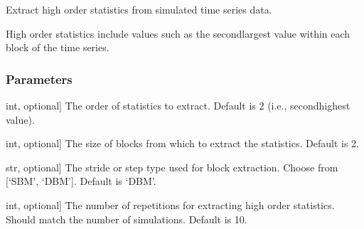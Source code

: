 \documentclass[a4paper,11pt,openany,english]{sphinxmanual}
\begin{document}
\begin{fulllineitems}
\begin{fulllineitems}
\end{fulllineitems}


\begin{fulllineitems}
\label{\detokenize{api_topt:xtremes.topt.TimeSeries.get_HOS}}
\pysigstartsignatures
{}
\pysigstopsignatures
\sphinxAtStartPar
Extract high order statistics from simulated time series data.

\sphinxAtStartPar
High order statistics include values such as the second\sphinxhyphen{}largest value within each block of the time series.


\subsubsection{Parameters}
\label{\detokenize{api_topt:id1}}\begin{description}
\sphinxlineitem{orderstats}{[}int, optional{]}
\sphinxAtStartPar
The order of statistics to extract. Default is 2 (i.e., second\sphinxhyphen{}highest value).

\sphinxlineitem{block\_size}{[}int, optional{]}
\sphinxAtStartPar
The size of blocks from which to extract the statistics. Default is 2.

\sphinxlineitem{stride}{[}str, optional{]}
\sphinxAtStartPar
The stride or step type used for block extraction. Choose from {[}‘SBM’, ‘DBM’{]}. Default is ‘DBM’.

\sphinxlineitem{rep}{[}int, optional{]}
\sphinxAtStartPar
The number of repetitions for extracting high order statistics. Should match the number of simulations. Default is 10.

\end{description}

\end{fulllineitems}



\end{fulllineitems}
\end{document}
